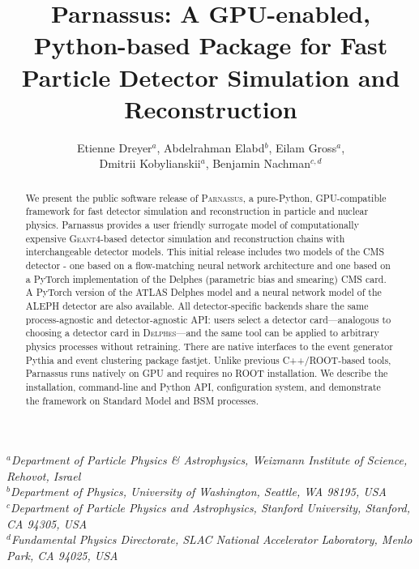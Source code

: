 \documentclass[11pt,a4paper]{article}          %
\begin{document}

\title{Parnassus: A GPU-enabled, Python-based Package for Fast Particle Detector Simulation and Reconstruction}

\author{Etienne Dreyer$^{a}$, Abdelrahman Elabd$^{b}$, Eilam Gross$^{a}$,\\
  Dmitrii Kobylianskii$^{a}$,
  Benjamin Nachman$^{c,d}$}

\date{}

\maketitle

\noindent
$^{a}$\textit{Department of Particle Physics \& Astrophysics, Weizmann Institute of Science, Rehovot, Israel}\\
$^{b}$\textit{Department of Physics, University of Washington, Seattle, WA 98195, USA}\\
$^{c}$\textit{Department of Particle Physics and Astrophysics, Stanford University, Stanford, CA 94305, USA}\\
$^{d}$\textit{Fundamental Physics Directorate, SLAC National Accelerator Laboratory, Menlo Park, CA 94025, USA}


\bigskip

\begin{abstract}
We present the public software release of \textsc{Parnassus}, a pure-Python,
GPU-compatible framework for fast detector simulation and reconstruction in
particle and nuclear physics. Parnassus provides a user friendly surrogate model of computationally expensive
\textsc{Geant4}-based detector simulation and reconstruction chains with interchangeable detector models.  This initial release includes two models of the CMS detector - one based on a flow-matching neural network architecture and one based on a PyTorch implementation of the Delphes (parametric bias and smearing) CMS card.  A PyTorch version of the ATLAS Delphes model and a neural network model of the ALEPH detector are also available. All detector-specific backends share the same
process-agnostic and detector-agnostic API: users select a detector
card---analogous to choosing a detector card in \textsc{Delphes}---and the
same tool can be applied to arbitrary physics processes without retraining.  There are native interfaces to the event generator Pythia and event clustering package fastjet.  Unlike previous C++/ROOT-based tools, Parnassus runs natively
on GPU and requires no ROOT installation.  We describe
the installation, command-line and Python API, configuration system, and
demonstrate the framework on Standard Model and BSM processes.
\end{abstract}
\end{document}
